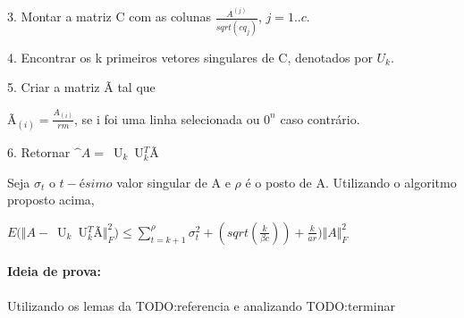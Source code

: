 \documentclass[a4paper,10pt]{article}
\begin{document}
3. Montar a matriz C com as colunas $\frac{A^(j)}{sqrt(cq_j)}$, $j = 1 .. c$.

4. Encontrar os k primeiros vetores singulares de C, denotados por $U_k$.

5. Criar a matriz Ã tal que 

Ã$_{(i)}  = \frac{A_{(i)}}{rm}$, se i foi uma linha selecionada ou $0^n$ caso contrário.

6. Retornar $\^A = $~U$_k$~U$_k^T$Ã


\begin{teo}
Seja $\sigma_t$ o $t-ésimo$ valor singular de A e $\rho$ é o posto de A. Utilizando
o algoritmo proposto acima, 

$E(\Vert A - $~U$_k$~U$_k^T$Ã$ \Vert^2_F) \leq \sum_{t = k + 1}^\rho \sigma_t^2 + 
(sqrt(\frac{k}{\beta c}))  + \frac{k}{ar})\Vert A \Vert^2_F
$
\end{teo}

\paragraph{Ideia de prova:} Utilizando os lemas da TODO:referencia e 
analizando TODO:terminar





\end{document}
